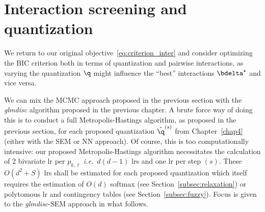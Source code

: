 \section{Interaction screening and quantization}

We return to our original objective~\eqref{eq:criterion_inter} and consider optimizing the BIC criterion both in terms of quantization and pairwise interactions, as varying the quantization $\q$ might influence the ``best'' interactions $\bdelta^\star$ and vice versa.

We can mix the MCMC approach proposed in the previous section with the \textit{glmdisc} algorithm proposed in the previous chapter. A brute force way of doing this is to conduct a full Metropolis-Hastings algorithm, as proposed in the previous section, for each proposed quantization $\hat{\q}^{(s)}$ from Chapter~\ref{chap4} (either with the SEM or NN approach). Of course, this is too computationally intensive: our proposed Metropolis-Hastings algorithm necessitates the calculation of 2 bivariate \gls{lr} per $p_{k,\ell}$ \textit{i.e.}\ $d(d-1)$ \gls{lr}s and one \gls{lr} per step $(s)$. These $O(d^2 + S)$ \gls{lr}s shall be estimated for each proposed quantization which itself requires the estimation of $O(d)$ softmax (see Section~\ref{subsec:relaxation}) or polytomous \gls{lr} and contingency tables (see Section~\ref{subsec:fuzzy}). Focus is given to the \textit{glmdisc}-SEM approach in what follows.

